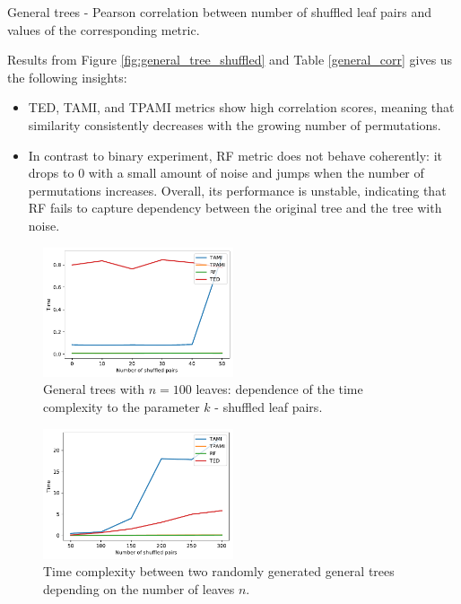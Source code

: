 \begin{table}[H]
	\begin{center}
		\caption{General trees - Pearson correlation between number of shuffled leaf pairs and values of the corresponding metric. \label{general_corr}}
		
	\end{center}
\end{table}

Results from Figure \ref{fig:general_tree_shuffled} and Table \ref{general_corr} gives us the following insights:

\begin{itemize}
	\item TED, TAMI, and TPAMI metrics show high correlation scores, meaning that similarity consistently decreases with the growing number of permutations.
	\item In contrast to binary experiment, RF metric does not behave coherently: it drops to 0 with a small amount of noise and jumps when the number of permutations increases. Overall, its performance is unstable, indicating that RF fails to capture dependency between the original tree and the tree with noise. 
\end{itemize}

\begin{figure}[H]
	\begin{center}
		\includegraphics[width=0.5\textwidth]{figures/1-syntatic-time-trees-general.pdf}
		\caption{General trees with $n=100$ leaves: dependence of the time complexity to the parameter $k$ - shuffled leaf pairs.}
		\label{fig:general_tree_shuffled_time}
	\end{center}
\end{figure}

\begin{figure}[H]
	\begin{center}
		\includegraphics[width=0.5\textwidth]{figures/1-syntatic-general-tree-time-vs-n-leaves.pdf}
		\caption{Time complexity between two randomly generated general trees depending on the number of leaves $n$.}
		\label{fig:general_tree_shuffled_time_to_n_leaves}
	\end{center}
\end{figure}

